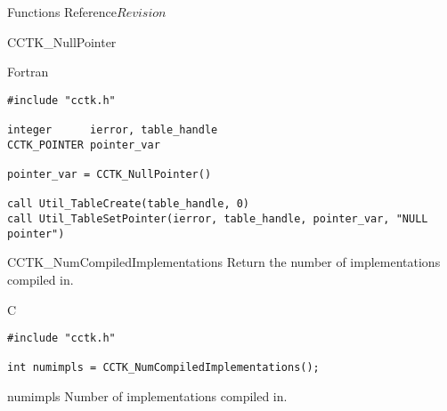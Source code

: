 \begin{cactuspart}{ Functions Reference}{}{$Revision$}
\begin{FunctionDescription}{CCTK\_NullPointer}
\begin{ExampleSection}
\begin{Example}{Fortran}
\begin{verbatim}
#include "cctk.h"

integer      ierror, table_handle
CCTK_POINTER pointer_var

pointer_var = CCTK_NullPointer()

call Util_TableCreate(table_handle, 0)
call Util_TableSetPointer(ierror, table_handle, pointer_var, "NULL pointer")
\end{verbatim}
\end{Example}
\end{ExampleSection}
\end{FunctionDescription}



\begin{FunctionDescription}{CCTK\_NumCompiledImplementations}
\label{CCTK-NumCompiledImplementations}
Return the number of implementations compiled in.

\begin{SynopsisSection}
\begin{Synopsis}{C}
\begin{verbatim}
#include "cctk.h"

int numimpls = CCTK_NumCompiledImplementations();
\end{verbatim}
\end{Synopsis}
\end{SynopsisSection}

\begin{ResultSection}
\begin{Result}{numimpls}
Number of implementations compiled in.
\end{Result}
\end{ResultSection}




\end{FunctionDescription}
\end{cactuspart}
